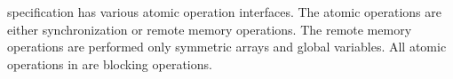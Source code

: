 \openshmem{} specification has various atomic operation interfaces. The atomic 
operations are either synchronization or remote memory operations. The remote memory 
operations are performed only symmetric arrays and global variables. 
All atomic operations in \openshmem{} are blocking operations.


